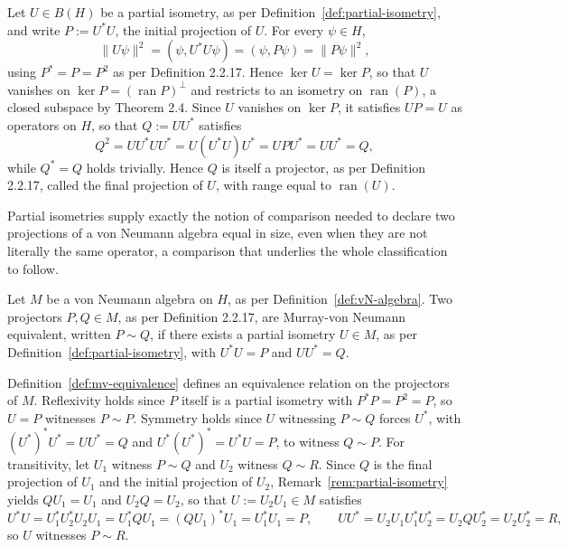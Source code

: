 \begin{remark}\label{rem:partial-isometry}
	Let $U \in B(H)$ be a partial isometry, as per
	Definition~\ref{def:partial-isometry}, and write $P := U^*U$, the
	initial projection of $U$. For every $\psi \in H$,
	\[
	\lVert U\psi \rVert^2 = (\psi, U^*U\psi) = (\psi, P\psi) = \lVert
	P\psi \rVert^2,
	\]
	using $P^* = P = P^2$ as per Definition 2.2.17. Hence $\ker U = \ker
	P$, so that $U$ vanishes on $\ker P = (\operatorname{ran} P)^\perp$
	and restricts to an isometry on $\operatorname{ran}(P)$, a closed
	subspace by Theorem 2.4. Since $U$ vanishes on $\ker P$, it satisfies
	$UP = U$ as operators on $H$, so that $Q := UU^*$ satisfies
	\[
	Q^2 = UU^*UU^* = U(U^*U)U^* = UPU^* = UU^* = Q,
	\]
	while $Q^* = Q$ holds trivially. Hence $Q$ is itself a projector, as
	per Definition 2.2.17, called the final projection of $U$, with range
	equal to $\operatorname{ran}(U)$.
\end{remark}

Partial isometries supply exactly the notion of comparison needed to
declare two projections of a von Neumann algebra equal in size, even
when they are not literally the same operator, a comparison that
underlies the whole classification to follow.

\begin{definition}\label{def:mv-equivalence}
	Let $M$ be a von Neumann algebra on $H$, as per
	Definition~\ref{def:vN-algebra}. Two projectors $P, Q \in M$, as per
	Definition 2.2.17, are Murray-von Neumann equivalent, written $P \sim
	Q$, if there exists a partial isometry $U \in M$, as per
	Definition~\ref{def:partial-isometry}, with $U^*U = P$ and $UU^* = Q$.
\end{definition}

\begin{remark}
	Definition~\ref{def:mv-equivalence} defines an equivalence relation on
	the projectors of $M$. Reflexivity holds since $P$ itself is a partial
	isometry with $P^*P = P^2 = P$, so $U = P$ witnesses $P \sim P$.
	Symmetry holds since $U$ witnessing $P \sim Q$ forces $U^*$, with
	$(U^*)^*U^* = UU^* = Q$ and $U^*(U^*)^* = U^*U = P$, to witness $Q \sim
	P$. For transitivity, let $U_1$ witness $P \sim Q$ and $U_2$ witness $Q
	\sim R$. Since $Q$ is the final projection of $U_1$ and the initial
	projection of $U_2$, Remark~\ref{rem:partial-isometry} yields $QU_1 =
	U_1$ and $U_2Q = U_2$, so that $U := U_2U_1 \in M$ satisfies
	\[
	U^*U = U_1^*U_2^*U_2U_1 = U_1^*QU_1 = (QU_1)^*U_1 = U_1^*U_1 = P,
	\qquad UU^* = U_2U_1U_1^*U_2^* = U_2QU_2^* = U_2U_2^* = R,
	\]
	so $U$ witnesses $P \sim R$.
\end{remark}

